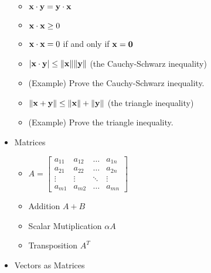 \documentclass[11pt]{article}
\begin{document}
\begin{itemize}
\begin{itemize}
      \item
        \(
          \mathbf{x}\cdot\mathbf{y}
            =
          \mathbf{y}\cdot\mathbf{x}
        \)
      \item
        \(
          \mathbf{x}\cdot\mathbf{x} \geq 0
        \)
      \item
        \(
          \mathbf{x}\cdot\mathbf{x} = 0
        \)
        if and only if
        \(
          \mathbf{x}=\mathbf{0}
        \)
      \item
        \(
          |\mathbf{x}\cdot\mathbf{y}|
            \leq
          \|\mathbf{x}\|\|\mathbf{y}\|
        \)
        (the Cauchy-Schwarz inequality)
      \item (Example) Prove the Cauchy-Schwarz inequality.
      \item
        \(
          \|\mathbf{x}+\mathbf{y}\|
            \leq
          \|\mathbf{x}\|+\|\mathbf{y}\|
        \)
        (the triangle inequality)
      \item (Example) Prove the triangle inequality.
    \end{itemize}
  \item Matrices
    \begin{itemize}
      \item
        \(
          A
            =
          \begin{bmatrix}
            a_{11} & a_{12} & \dots  & a_{1n} \\
            a_{21} & a_{22} & \dots  & a_{2n} \\
            \vdots & \vdots & \ddots & \vdots \\
            a_{m1} & a_{m2} & \dots  & a_{mn}
          \end{bmatrix}
        \)
      \item Addition \(A+B\)
      \item Scalar Mutiplication \(\alpha A\)
      \item Transposition \(A^T\)
    \end{itemize}
  \item Vectors as Matrices
\end{itemize}
\end{document}
